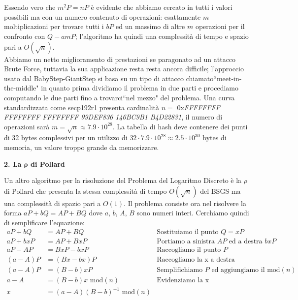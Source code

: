 \documentclass[a4paper,12pt]{tesiinfo}
\begin{document}
\\
\\
Essendo vero che $m^2P=nP$ \`e evidente che abbiamo cercato in tutti i valori possibili ma con un numero contenuto di operazioni: esattamente $m$ moltiplicazioni per trovare tutti i $bP$ ed un massimo di altre $m$ operazioni per il confronto con $Q-amP$; l'algoritmo ha quindi una complessit\`a di tempo e spazio pari a $O(\sqrt{n})$.
\\
Abbiamo un netto miglioramento di prestazioni se paragonato ad un attacco Brute Force, tuttavia la sua applicazione resta resta ancora difficile; l'approccio usato dal BabyStep-GiantStep si basa su un tipo di attacco chiamato``meet-in-the-middle" in quanto prima dividiamo il problema in due parti e procediamo computando le due parti fino a trovarci``nel mezzo" del problema. Una curva standardizzata come secp192r1 presenta cardinalit\`a $n = $ 0x\textit{FFFFFFFF FFFFFFFF FFFFFFFF 99DEF836 146BC9B1 B4D22831}, il numero di operazioni sar\`a $m = \sqrt{n} \approx 7.9 \cdot 10^{28}$. La tabella di hash deve contenere dei punti di 32 bytes complessivi per un utilizzo di $32 \cdot 7.9\cdot 10^{28} \approx 2.5 \cdot 10^{30}$ bytes di memoria, un valore troppo grande da memorizzare.
\\
\begin{center}
    \textbf{2. La $\mathbold{\rho}$ di Pollard}
\end{center}
Un altro algoritmo per la risoluzione del Problema del Logaritmo Discreto \`e la $\rho$ di Pollard che presenta la stessa complessit\`a di tempo $O(\sqrt{n})$ del BSGS ma una complessit\`a di spazio pari a $O(1)$. Il problema consiste ora nel risolvere la forma $aP + bQ = AP + BQ$ dove $a$, $b$, $A$, $B$ sono numeri interi. Cerchiamo quindi di semplificare l'equazione:
\begin{align*}
    aP + bQ &= AP + BQ &\text{Sostituiamo il punto }Q = xP\\
    aP + bxP &= AP + BxP &\text{Portiamo a sinistra $AP$ ed a destra $bxP$}\\
    aP -AP &= BxP -bxP &\text{Raccogliamo il punto }P\\
    (a -A)P &= (Bx -bx)P &\text{Raccogliamo la x a destra}\\
    (a -A)P &= (B -b)xP &\text{Semplifichiamo $P$ ed aggiungiamo il mod$(n)$}\\
    a -A &= (B -b)x\text{ mod$(n)$} &\text{Evidenziamo la x}\\
    x &= (a -A)(B -b)^{-1}\text{ mod$(n)$}
\end{align*}
\end{document}
